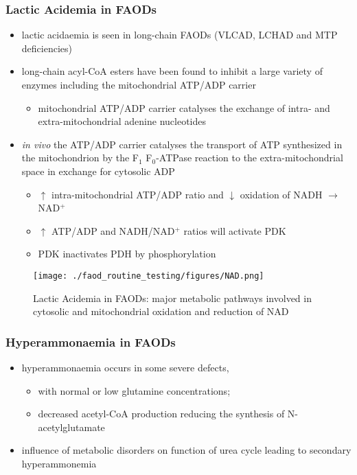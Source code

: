 \documentclass{scrartcl}
\begin{document}
\subsubsection{Lactic Acidemia in FAODs}
\label{sec:org6dec8e8}
\begin{itemize}
\item lactic acidaemia is seen in long-chain FAODs (VLCAD, LCHAD and MTP deficiencies)
\item long-chain acyl-CoA esters have been found to inhibit a large
variety of enzymes including the mitochondrial ATP/ADP carrier
\begin{itemize}
\item mitochondrial ATP/ADP carrier catalyses the exchange of intra- and
extra-mitochondrial adenine nucleotides
\end{itemize}
\item \emph{in vivo} the ATP/ADP carrier catalyses the transport of ATP
synthesized in the mitochondrion by the F\(_{\text{1}}\) F\(_{\text{0}}\)-ATPase reaction to the
extra-mitochondrial space in exchange for cytosolic ADP
\begin{itemize}
\item \(\uparrow\) intra-mitochondrial ATP/ADP ratio and \(\downarrow\) oxidation of
NADH \(\to\) NAD\(^{\text{+}}\)
\item \(\uparrow\) ATP/ADP and NADH/NAD\(^{\text{+}}\) ratios will activate PDK
\item PDK inactivates PDH by phosphorylation
\end{itemize}
\end{itemize}

\begin{figure}[htbp]
\centering
\texttt{[image: ./faod\_routine\_testing/figures/NAD.png]}
\caption{\label{fig:orge1ac8bb}
Lactic Acidemia in FAODs: major metabolic pathways involved in cytosolic and mitochondrial oxidation and reduction of NAD}
\end{figure}


\subsubsection{Hyperammonaemia in FAODs}
\label{sec:org897087a}
\begin{itemize}
\item hyperammonaemia occurs in some severe defects,
\begin{itemize}
\item with normal or low glutamine concentrations;
\item decreased acetyl-CoA production reducing the synthesis of N-acetylglutamate
\end{itemize}
\item influence of metabolic disorders on function of urea cycle leading
to secondary hyperammonemia
\end{itemize}
\end{document}
